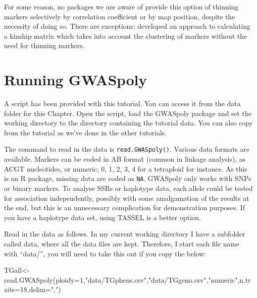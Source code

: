 \documentclass[
]{book}
\makeatletter
\newenvironment{Shaded}{\begin{snugshade}}{\end{snugshade}}
\newcommand{\AttributeTok}[1]{\textcolor[rgb]{0.77,0.63,0.00}{#1}}
\newcommand{\DecValTok}[1]{\textcolor[rgb]{0.00,0.00,0.81}{#1}}
\newcommand{\FunctionTok}[1]{\textcolor[rgb]{0.00,0.00,0.00}{#1}}
\newcommand{\NormalTok}[1]{#1}
\newcommand{\OtherTok}[1]{\textcolor[rgb]{0.56,0.35,0.01}{#1}}
\newcommand{\StringTok}[1]{\textcolor[rgb]{0.31,0.60,0.02}{#1}}
\newenvironment{kframe}{%
\medskip{}
\setlength{\fboxsep}{.8em}
 \def\at@end@of@kframe{}%
 \ifinner\ifhmode%
  \def\at@end@of@kframe{\end{minipage}}%
  \begin{minipage}{\columnwidth}%
 \fi\fi%
 \def\FrameCommand##1{\hskip\@totalleftmargin \hskip-\fboxsep
 \colorbox{shadecolor}{##1}\hskip-\fboxsep
     \hskip-\linewidth \hskip-\@totalleftmargin \hskip\columnwidth}%
 \MakeFramed {\advance\hsize-\width
   \@totalleftmargin\z@ \linewidth\hsize
   \@setminipage}}%
 {\par\unskip\endMakeFramed%
 \at@end@of@kframe}
\newenvironment{rmdblock}[1]
  {
  \begin{itemize}
  \renewcommand{\labelitemi}{
    \raisebox{-.7\height}[0pt][0pt]{
      {\setkeys{Gin}{width=3em,keepaspectratio}\texttt{[image: images/\#1]}}
    }
  }
  \setlength{\fboxsep}{1em}
  \begin{kframe}
  \item
  }
  {
  \end{kframe}
  \end{itemize}
  }
\newenvironment{rmdnote}
  {\begin{rmdblock}{note}}
  {\end{rmdblock}}
\makeatother
\begin{document}
For some reason, no packages we are aware of provide this option of thinning markers selectively by correlation coefficient or by map position, despite the necessity of doing so. There are exceptions: \citet{speed2012} developed an approach to calculating a kinship matrix which takes into account the clustering of markers without the need for thinning markers.

\hypertarget{running-gwaspoly}{%
\section{Running GWASpoly}\label{running-gwaspoly}}

\begin{rmdnote}
A script has been provided with this tutorial. You can access it from the data folder for this Chapter. Open the script, load the GWASpoly package and set the working directory to the directory containing the tutorial data. You can also copy from the tutorial as we've done in the other tutorials.
\end{rmdnote}

The command to read in the data is \texttt{read.GWASpoly()}. Various data formats are available. Markers can be coded in AB format (common in linkage analysis), as ACGT nucleotides, or numeric; 0, 1, 2, 3, 4 for a tetraploid for instance. As this is an R package, missing data are coded as \texttt{NA}. GWASpoly only works with SNPs or binary markers. To analyse SSRs or haplotype data, each allele could be tested for association independently, possibly with some amalgamation of the results at the end, but this is an unnecessary complication for demonstration purposes. If you have a haplotype data set, using TASSEL is a better option.

Read in the data as follows. In my current working directory I have a subfolder called data, where all the data files are kept. Therefore, I start each file name with ``data/'', you will need to take this out if you copy the below:

\begin{Shaded}
\begin{Highlighting}[]
\NormalTok{TGall}\OtherTok{\textless{}{-}}\FunctionTok{read.GWASpoly}\NormalTok{(}\AttributeTok{ploidy=}\DecValTok{1}\NormalTok{,}\StringTok{"data/TGphens.csv"}\NormalTok{,}\StringTok{"data/TGgeno.csv"}\NormalTok{,}\StringTok{"numeric"}\NormalTok{,}\AttributeTok{n.traits=}\DecValTok{18}\NormalTok{,}\AttributeTok{delim=}\StringTok{","}\NormalTok{)}
\end{Highlighting}
\end{Shaded}
\end{document}
